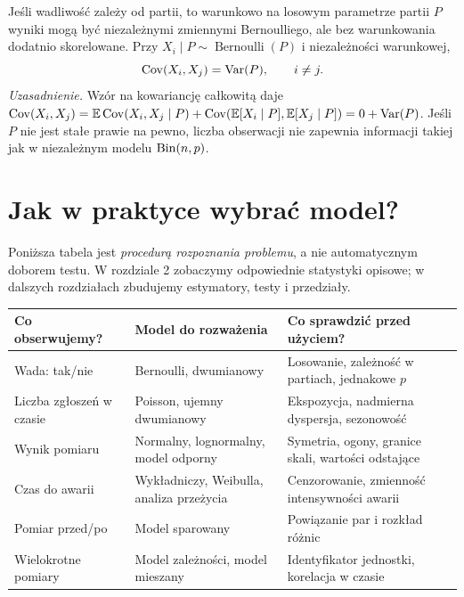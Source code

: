\begin{przyklad}
Jeśli wadliwość zależy od partii, to warunkowo na losowym parametrze partii $P$ wyniki mogą być niezależnymi zmiennymi Bernoulliego, ale bez warunkowania dodatnio skorelowane. Przy $X_i\mid P\sim\operatorname{Bernoulli}(P)$ i niezależności warunkowej,
\[
\operatorname{Cov}(X_i,X_j)=\operatorname{Var}(P),\qquad i\neq j.
\]
\emph{Uzasadnienie.} Wzór na kowariancję całkowitą daje $\operatorname{Cov}(X_i,X_j)=\mathbb E\operatorname{Cov}(X_i,X_j\mid P)+\operatorname{Cov}(\mathbb E[X_i\mid P],\mathbb E[X_j\mid P])=0+\operatorname{Var}(P)$. Jeśli $P$ nie jest stałe prawie na pewno, liczba obserwacji nie zapewnia informacji takiej jak w niezależnym modelu $\operatorname{Bin}(n,p)$.
\end{przyklad}

\section{Jak w praktyce wybrać model?}
Poniższa tabela jest \emph{procedurą rozpoznania problemu}, a nie automatycznym doborem testu. W rozdziale 2 zobaczymy odpowiednie statystyki opisowe; w dalszych rozdziałach zbudujemy estymatory, testy i przedziały.

\begin{center}\small
\begin{tabular}{>{\raggedright\arraybackslash}p{}>{\raggedright\arraybackslash}p{}>{\raggedright\arraybackslash}p{}}
\toprule
\textbf{Co obserwujemy?} & \textbf{Model do rozważenia} & \textbf{Co sprawdzić przed użyciem?}\\
\midrule
Wada: tak/nie & Bernoulli, dwumianowy & Losowanie, zależność w partiach, jednakowe $p$\\
Liczba zgłoszeń w czasie & Poisson, ujemny dwumianowy & Ekspozycja, nadmierna dyspersja, sezonowość\\
Wynik pomiaru & Normalny, lognormalny, model odporny & Symetria, ogony, granice skali, wartości odstające\\
Czas do awarii & Wykładniczy, Weibulla, analiza przeżycia & Cenzorowanie, zmienność intensywności awarii\\
Pomiar przed/po & Model sparowany & Powiązanie par i rozkład różnic\\
Wielokrotne pomiary & Model zależności, model mieszany & Identyfikator jednostki, korelacja w czasie\\
\bottomrule
\end{tabular}
\end{center}

